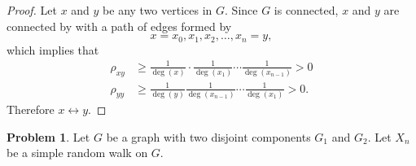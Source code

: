 \documentclass[oneside,reqno]{amsart}
\theoremstyle{definition}
\newtheorem{prob}{Problem}
\begin{document}
\begin{proof}
Let $x$ and $y$ be any two vertices in $G$. Since $G$ is connected, $x$ and $y$ are connected by with a path of edges formed by
\[
	x = x_0, x_1, x_2, \dotsc, x_n=y,
\] 
which implies that 
\begin{align*}
	\rho_{xy} & \geq \frac{1}{\deg(x)} \cdot \frac{1}{\deg(x_1)} \cdots \frac{1}{\deg(x_{n-1})} >0 \\
	\rho_{yy} & \geq \frac{1}{\deg(y)} \frac{1}{\deg(x_{n-1})} \cdots \frac{1}{\deg(x_1)}  >0 .
\end{align*}
Therefore $x \leftrightarrow y$.
\end{proof}

\begin{prob}
Let $G$ be a graph with two disjoint components $G_1$ and $G_2$. Let $X_n$ be a simple random walk on $G$.
\end{prob}
\end{document}
